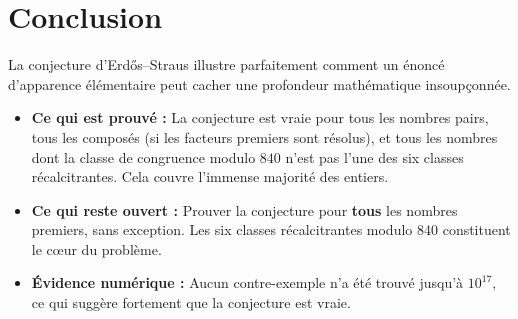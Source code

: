 \documentclass[12pt,a4paper]{article}
\begin{document}
\section{Conclusion}

La conjecture d'Erdős--Straus illustre parfaitement comment un énoncé d'apparence élémentaire peut cacher une profondeur mathématique insoupçonnée.

\begin{itemize}
    \item \textbf{Ce qui est prouvé :} La conjecture est vraie pour tous les nombres pairs, tous les composés (si les facteurs premiers sont résolus), et tous les nombres dont la classe de congruence modulo $840$ n'est pas l'une des six classes récalcitrantes. Cela couvre l'immense majorité des entiers.
    \item \textbf{Ce qui reste ouvert :} Prouver la conjecture pour \textbf{tous} les nombres premiers, sans exception. Les six classes récalcitrantes modulo $840$ constituent le cœur du problème.
    \item \textbf{Évidence numérique :} Aucun contre-exemple n'a été trouvé jusqu'à $10^{17}$, ce qui suggère fortement que la conjecture est vraie.
\end{itemize}

\vspace{1em}
\begin{center}
\end{center}
\end{document}
